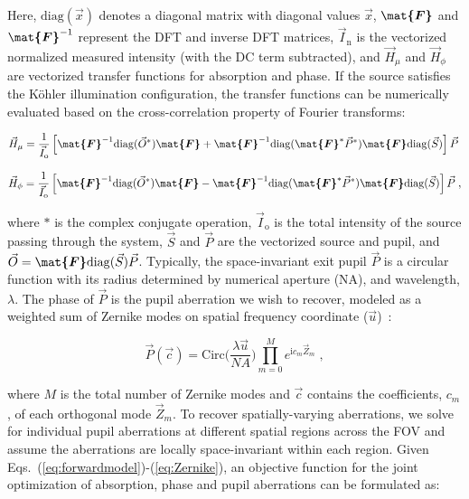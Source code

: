 \noindent Here, $\mathrm{diag}(\vec{x})$ denotes a diagonal matrix with diagonal values $\vec{x}$, $\boldsymbol{\mat{F}}$ and $\boldsymbol{\mat{F}}^{-1}$ represent the DFT and inverse DFT matrices, $\vec{I}_{\mathrm{n}}$ is the vectorized normalized measured intensity (with the DC term subtracted), and $\vec{H}_{\mu}$ and $\vec{H}_{\phi}$ are vectorized transfer functions for absorption and phase. If the source satisfies the K\"{o}hler illumination configuration, the transfer functions can be numerically evaluated based on the cross-correlation property of Fourier transforms:

\begin{equation}
\label{eq:Hu_matrix}
\vec{H}_{\mu} = \frac{1}{\vec{I}_{\mathrm{o}}}\left[\boldsymbol{\mat{F}}^{-1}\mathrm{diag} (\vec{O}^{*}) \boldsymbol{\mat{F}} + \boldsymbol{\mat{F}}^{-1}\mathrm{diag} (\boldsymbol{\mat{F}}^{*}{\vec{P}}^{*})\boldsymbol{\mat{F}}\mathrm{diag}(\vec{S})\right]\vec{P}\; 
\end{equation}

\begin{equation}
\label{eq:Hp_matrix}
\vec{H}_{\phi} = \frac{1}{\vec{I}_{\mathrm{o}}}\left[\boldsymbol{\mat{F}}^{-1}\mathrm{diag} (\vec{O}^{*}) \boldsymbol{\mat{F}} - \boldsymbol{\mat{F}}^{-1}\mathrm{diag} (\boldsymbol{\mat{F}}^{*}{\vec{P}}^{*})\boldsymbol{\mat{F}}\mathrm{diag}(\vec{S})\right]\vec{P}\;,
\end{equation}

\noindent where $*$ is the complex conjugate operation, $\vec{I}_{\mathrm{o}}$ is the total intensity of the source passing through the system, $\vec{S}$ and $\vec{P}$ are the vectorized source and pupil, and $\vec{O} = \boldsymbol{\mat{F}}\mathrm{diag}(\vec{S})\vec{P}$. Typically, the space-invariant exit pupil $\vec{P}$ is a circular function with its radius determined by numerical aperture ($\mathrm{NA}$), and wavelength, $\lambda$. The phase of $\vec{P}$ is the pupil aberration we wish to recover, modeled as a weighted sum of Zernike modes on spatial frequency coordinate ($\vec{u}$)~\cite{ZERNIKE1934689}:

\begin{equation}
\label{eq:Zernike}
\vec{P}(\vec{c}) = \mathrm{Circ}\Big(\frac{\lambda\vec{u}}{NA}\Big)\prod_{m=0}^{M} e^{\mathrm{i}c_{m}\vec{Z}_{m}}\; ,
\end{equation}

\noindent where $M$ is the total number of Zernike modes and $\vec{c}$ contains the coefficients, $c_{m}$, of each orthogonal mode $\vec{Z}_{m}$. To recover spatially-varying aberrations, we solve for individual pupil aberrations at different spatial regions across the FOV and assume the aberrations are locally space-invariant within each region. Given Eqs.~(\ref{eq:forwardmodel})-(\ref{eq:Zernike}), an objective function for the joint optimization of absorption, phase and pupil aberrations can be formulated as:

